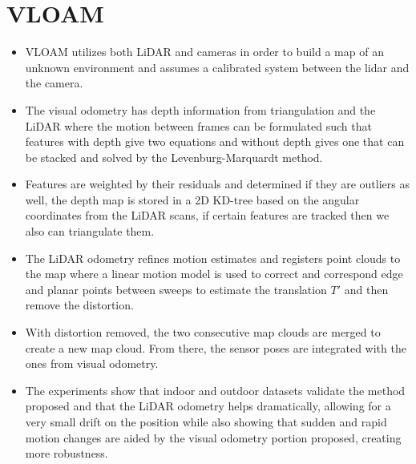 \documentclass[a4paper]{article}
\begin{document}
\section{VLOAM}
\begin{itemize}
    \item VLOAM utilizes both LiDAR and cameras in order to build a map of an unknown environment and assumes a calibrated system between the lidar and the camera.
    \item The visual odometry has depth information from triangulation and the LiDAR where the motion between frames can be formulated such that features with depth give two equations and without depth gives one that can be stacked and solved by the Levenburg-Marquardt method.
    \item Features are weighted by their residuals and determined if they are outliers as well, the depth map is stored in a 2D KD-tree based on the angular coordinates from the LiDAR scans, if certain features are tracked then we also can triangulate them.
    \item The LiDAR odometry refines motion estimates and registers point clouds to the map where a linear motion model is used to correct and correspond edge and planar points between sweeps to estimate the translation $T'$ and then remove the distortion.
    \item With distortion removed, the two consecutive map clouds are merged to create a new map cloud. From there, the sensor poses are integrated with the ones from visual odometry.
    \item The experiments show that indoor and outdoor datasets validate the method proposed and that the LiDAR odometry helps dramatically, allowing for a very small drift on the position while also showing that sudden and rapid motion changes are aided by the visual odometry portion proposed, creating more robustness.
\end{itemize}
\end{document}
